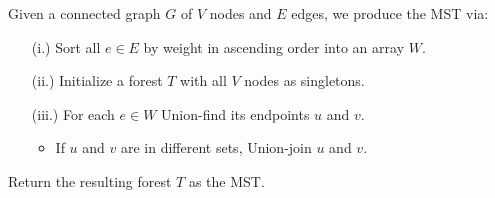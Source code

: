 \begin{theo}

    \label{theo:kruskal}
    Given a connected graph $G$ of $V$ nodes and $E$ edges, we produce the MST via:
    \begin{enumerate}
        \item [(i.)] Sort all $e\in E$ by weight in ascending order into an array $W$.
        \item [(ii.)] Initialize a forest $T$ with all $V$ nodes as singletons.
        \item [(iii.)] For each $e\in W$ Union-find its endpoints $u$ and $v$.
        \begin{itemize}
            \item If $u$ and $v$ are in different sets, Union-join $u$ and $v$.
        \end{itemize}
    \end{enumerate}
    \noindent
    Return the resulting forest $T$ as the MST.
\end{theo}

